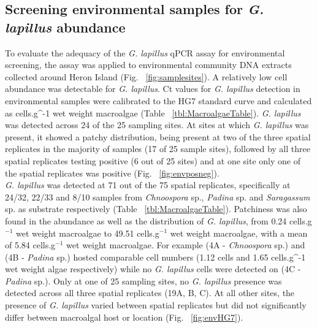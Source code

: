 \documentclass[12pt]{article}
\begin{document}
\subsection*{Screening environmental samples for \emph{G. lapillus} abundance }%
\FloatBarrier
To evaluate the adequacy of the \emph{G. lapillus} %
qPCR assay for environmental screening, the assay was applied to environmental community DNA extracts collected around Heron Island (Fig. ~\ref{fig:samplesites}). 
A relatively low cell abundance was detectable for \emph{G. lapillus}. 
Ct values for \emph{G. lapillus} detection in environmental samples were calibrated to the HG7 standard curve and calculated as cells.g^{-1} wet weight macroalgae (Table ~\ref{tbl:MacroalgaeTable}).  
\emph{G. lapillus} was detected across 24 of the 25 sampling sites. 
At sites at which \textit{G. lapillus} was present, it showed a patchy distribution, being present at two of the three spatial replicates in the majority of samples (17 of 25 sample sites), followed by all three spatial replicates testing positive (6 out of 25 sites) and at one site only one of the spatial replicates was positive (Fig. ~\ref{fig:envposneg}). \\
\emph{G. lapillus} was detected at 71 out of the 75 spatial replicates, specifically at 24/32, 22/33 and 8/10 samples from \emph{Chnoospora} sp., \emph{Padina} sp. and \emph{Saragassum} sp. as substrate respectively (Table ~\ref{tbl:MacroalgaeTable}).
Patchiness was also found in the abundance as well as the distribution of \emph{G. lapillus}, from 0.24 cells.g$^{-1}$ wet weight macroalgae to 49.51 cells.g$^{-1}$ wet weight macroalgae, with a mean of 5.84 cells.g$^{-1}$ wet weight macroalgae. 
For example (4A - \emph{Chnoospora} sp.) and (4B - \emph{Padina} sp.) hosted comparable cell numbers (1.12 cells and 1.65 cells.g^{-1} wet weight algae respectively) while no \emph{G. lapillus} cells were detected on (4C - \emph{Padina} sp.).
Only at one of 25 sampling sites, no \emph{G. lapillus} presence was detected across all three spatial replicates (19A, B, C).
At all other sites, the presence of \textit{G. lapillus} varied between spatial replicates but did not significantly differ between macroalgal host or location (Fig. ~\ref{fig:envHG7}). 
\end{document}
